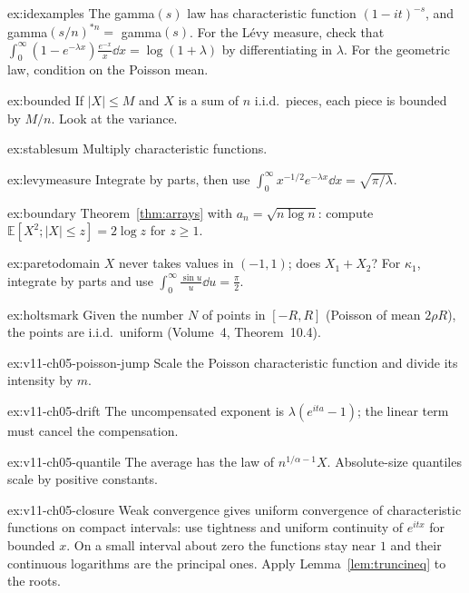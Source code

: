 \begin{hint}{ex:idexamples}
The gamma$(s)$ law has characteristic function $(1-it)^{-s}$, and gamma$(s/n)^{*n}=$ gamma$(s)$. For the L\'evy measure, check that
$\int_0^\infty(1-e^{-\lambda x})\frac{e^{-x}}x\dd x=\log(1+\lambda)$ by differentiating in $\lambda$. For the geometric law, condition on the Poisson mean.
\end{hint}
\begin{hint}{ex:bounded}
If $|X|\le M$ and $X$ is a sum of $n$ i.i.d.\ pieces, each piece is bounded by $M/n$. Look at the variance.
\end{hint}
\begin{hint}{ex:stablesum}
Multiply characteristic functions.
\end{hint}
\begin{hint}{ex:levymeasure}
Integrate by parts, then use $\int_0^\infty x^{-1/2}e^{-\lambda x}\dd x=\sqrt{\pi/\lambda}$.
\end{hint}
\begin{hint}{ex:boundary}
Theorem~\ref{thm:arrays} with $a_n=\sqrt{n\log n}$: compute $\mathbb E[X^2;|X|\le z]=2\log z$ for $z\ge1$.
\end{hint}
\begin{hint}{ex:paretodomain}
$X$ never takes values in $(-1,1)$; does $X_1+X_2$? For $\kappa_1$, integrate
by parts and use $\int_0^\infty\frac{\sin u}u\dd u=\frac\pi2$.
\end{hint}
\begin{hint}{ex:holtsmark}
Given the number $N$ of points in $[-R,R]$ (Poisson of mean $2\rho R$), the points are i.i.d.\ uniform (Volume~4, Theorem~10.4).
\end{hint}

\begin{hint}{ex:v11-ch05-poisson-jump}
Scale the Poisson characteristic function and divide its intensity by $m$.
\end{hint}
\begin{hint}{ex:v11-ch05-drift}
The uncompensated exponent is $\lambda(e^{ita}-1)$; the linear term must cancel the compensation.
\end{hint}
\begin{hint}{ex:v11-ch05-quantile}
The average has the law of $n^{1/\alpha-1}X$. Absolute-size quantiles scale by positive constants.
\end{hint}
\begin{hint}{ex:v11-ch05-closure}
Weak convergence gives uniform convergence of characteristic functions on compact intervals: use tightness and uniform continuity of $e^{itx}$ for bounded $x$. On a small interval about zero the functions stay near $1$ and their continuous logarithms are the principal ones. Apply Lemma~\ref{lem:truncineq} to the roots.
\end{hint}

